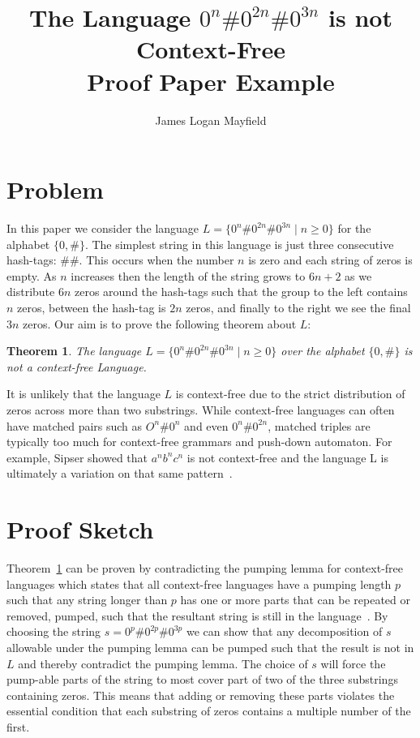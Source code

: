 \documentclass[10pt]{article}
\title{ The Language $0^n\#0^{2n}\#0^{3n}$ is not Context-Free \\ \small{Proof Paper Example} }
\author{James Logan Mayfield}
\newtheorem{theorem}{Theorem}
\theoremstyle{definition}
\begin{document}
\maketitle

\section{ Problem }

In this paper we consider the language $L = \lbrace 0^n\#0^{2n}\#0^{3n} \mid n \geq 0 \rbrace$ for the alphabet $\lbrace 0,\# \rbrace$. The simplest string in this language is just three consecutive hash-tags: $\# \#$. This occurs when the number $n$ is zero and each string of zeros is empty. As $n$ increases then the length of the string grows to $6n+2$ as we distribute $6n$ zeros around the hash-tags such that the group to the left contains $n$ zeros, between the hash-tag is $2n$ zeros, and finally to the right we see the final $3n$ zeros. Our aim is to prove the following theorem about $L$:

\begin{theorem}
The language $L = \lbrace 0^n\#0^{2n}\#0^{3n} \mid n \geq 0 \rbrace$ over the alphabet $\lbrace 0,\# \rbrace$ is not a context-free Language.
\label{th}
\end{theorem}

It is unlikely that the language $L$ is context-free due to the strict distribution of zeros across more than two substrings.  While context-free languages can often have matched pairs such as $O^n\# 0^n$ and even $0^n \# 0^{2n}$, matched triples are typically too much for context-free grammars and push-down automaton. For example, Sipser showed that $a^{n}b^{n}c^{n}$ is not context-free and the language L is ultimately a variation on that same pattern~\cite{Sipser}.

\section{ Proof Sketch }

Theorem~\ref{th} can be proven by contradicting the pumping lemma for context-free languages which states that all context-free languages have a pumping length $p$ such that any string longer than $p$ has one or more parts that can be repeated or removed, pumped, such that the resultant string is still in the language~\cite{Sipser}. By choosing the string $s = 0^p\#0^{2p}\#0^{3p}$ we can show that any decomposition of $s$ allowable under the pumping lemma can be pumped such that the result is not in $L$ and thereby contradict the pumping lemma. The choice of $s$ will force the pump-able parts of the string to most cover part of two of the three substrings containing zeros. This means that adding or removing these parts violates the essential condition that each substring of zeros contains a multiple number of the first.
\end{document}
